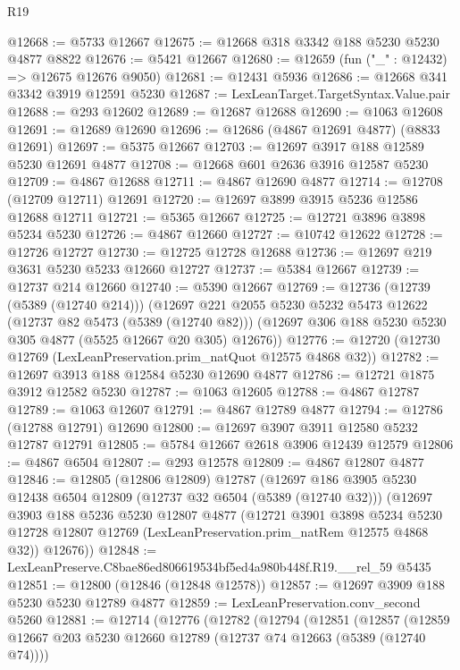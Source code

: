 \begin{lexlean}{R19}
\begin{coremodule}
@12668 := @5733 @12667
@12675 := @12668 @318 @3342 @188 @5230 @5230 @4877 @8822
@12676 := @5421 @12667
@12680 := @12659 (fun ("_" : @12432) => @12675 @12676 @9050)
@12681 := @12431 @5936
@12686 := @12668 @341 @3342 @3919 @12591 @5230
@12687 := LexLeanTarget.TargetSyntax.Value.pair
@12688 := @293 @12602
@12689 := @12687 @12688
@12690 := @1063 @12608
@12691 := @12689 @12690
@12696 := @12686 (@4867 @12691 @4877) (@8833 @12691)
@12697 := @5375 @12667
@12703 := @12697 @3917 @188 @12589 @5230 @12691 @4877
@12708 := @12668 @601 @2636 @3916 @12587 @5230
@12709 := @4867 @12688
@12711 := @4867 @12690 @4877
@12714 := @12708 (@12709 @12711) @12691
@12720 := @12697 @3899 @3915 @5236 @12586 @12688 @12711
@12721 := @5365 @12667
@12725 := @12721 @3896 @3898 @5234 @5230
@12726 := @4867 @12660
@12727 := @10742 @12622
@12728 := @12726 @12727
@12730 := @12725 @12728 @12688
@12736 := @12697 @219 @3631 @5230 @5233 @12660 @12727
@12737 := @5384 @12667
@12739 := @12737 @214 @12660
@12740 := @5390 @12667
@12769 := @12736
    (@12739 (@5389 (@12740 @214)))
    (@12697
      @221
      @2055
      @5230
      @5232
      @5473
      @12622
      (@12737 @82 @5473 (@5389 (@12740 @82)))
      (@12697 @306 @188 @5230 @5230 @305 @4877 (@5525 @12667 @20 @305) @12676))
@12776 := @12720 (@12730 @12769 (LexLeanPreservation.prim_natQuot @12575 @4868 @32))
@12782 := @12697 @3913 @188 @12584 @5230 @12690 @4877
@12786 := @12721 @1875 @3912 @12582 @5230
@12787 := @1063 @12605
@12788 := @4867 @12787
@12789 := @1063 @12607
@12791 := @4867 @12789 @4877
@12794 := @12786 (@12788 @12791) @12690
@12800 := @12697 @3907 @3911 @12580 @5232 @12787 @12791
@12805 := @5784 @12667 @2618 @3906 @12439 @12579
@12806 := @4867 @6504
@12807 := @293 @12578
@12809 := @4867 @12807 @4877
@12846 := @12805
    (@12806 @12809)
    @12787
    (@12697
      @186
      @3905
      @5230
      @12438
      @6504
      @12809
      (@12737 @32 @6504 (@5389 (@12740 @32)))
      (@12697
        @3903
        @188
        @5236
        @5230
        @12807
        @4877
        (@12721
          @3901
          @3898
          @5234
          @5230
          @12728
          @12807
          @12769
          (LexLeanPreservation.prim_natRem @12575 @4868 @32))
        @12676))
@12848 := LexLeanPreserve.C8bae86ed806619534bf5ed4a980b448f.R19.__rel_59 @5435
@12851 := @12800 (@12846 (@12848 @12578))
@12857 := @12697 @3909 @188 @5230 @5230 @12789 @4877
@12859 := LexLeanPreservation.conv_second @5260
@12881 := @12714
    (@12776
      (@12782
        (@12794
          (@12851
            (@12857
              (@12859 @12667 @203 @5230 @12660 @12789 (@12737 @74 @12663 (@5389 (@12740 @74))))

\end{coremodule}
\end{lexlean}
